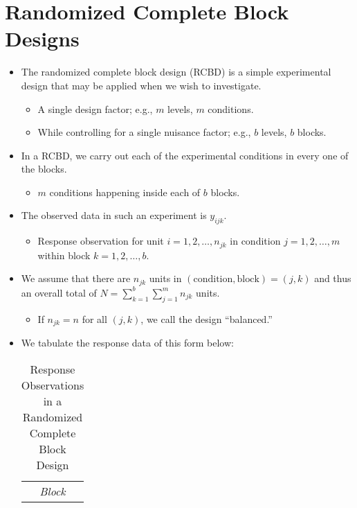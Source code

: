 \section{Randomized Complete Block Designs}
\begin{itemize}
      \item The randomized complete block design (RCBD) is a simple experimental design that may be applied
            when we wish to investigate.
            \begin{itemize}
                  \item A single design factor; e.g., $ m $ levels, $ m $ conditions.
                  \item While controlling for a single nuisance factor; e.g., $ b $ levels, $ b $ blocks.
            \end{itemize}
      \item In a RCBD, we carry out each of the experimental conditions in every one of the blocks.
            \begin{itemize}
                  \item $ m $ conditions happening inside each of $ b $ blocks.
            \end{itemize}
      \item The observed data in such an experiment is $ y_{ijk} $.
            \begin{itemize}
                  \item Response observation for unit $ i=1,2,\ldots,n_{jk} $ in condition $ j=1,2,\ldots,m $
                        within block $ k=1,2,\ldots,b $.
            \end{itemize}
      \item We assume that there are $n_{jk}$ units in $ (\text{condition}, \text{block}) = (j, k) $ and thus an overall total of
            $ N=\sum_{k=1}^{b} \sum_{j=1}^{m} n_{jk} $ units.
            \begin{itemize}
                  \item If $ n_{jk}=n $ for all $ (j,k) $, we call the design ``balanced.''
            \end{itemize}
      \item We tabulate the response data of this form below:
            \begin{table}[!htbp]
                  \centering
                  \caption{Response Observations in a Randomized Complete Block Design}
                  \begin{NiceTabular}{cc|cccc|c}
                               &  &                                                                                                                                                                                                                           \\

\end{NiceTabular}
\end{table}
\end{itemize}
